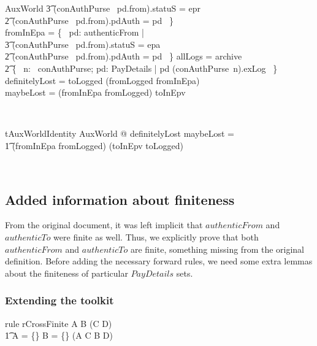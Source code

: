 \begin{LSDef}
\begin{schema}{AuxWorld}
          \t3 (conAuthPurse~ pd.from).statuS = epr \\
          \t2 \land (conAuthPurse~ pd.from).pdAuth = pd ~\} \\
   fromInEpa = \{~ pd: authenticFrom | \\
          \t3 (conAuthPurse~ pd.from).statuS = epa \\
          \t2 \land (conAuthPurse~ pd.from).pdAuth = pd ~\}
   \also
   allLogs = archive \cup \\
      \t2 \{~ n: \dom~conAuthPurse; pd: PayDetails | pd \in (conAuthPurse~n).exLog ~\}
   \also
   definitelyLost = toLogged \cap (fromLogged \cup fromInEpa) \\
   maybeLost = (fromInEpa \cup fromLogged) \cap toInEpv
\end{schema}~\end{LSDef}
%
\begin{LThm}
\begin{theorem}{tAuxWorldIdentity}
   \forall AuxWorld @ definitelyLost \cup maybeLost = \\
        \t1 (fromInEpa \cup fromLogged) \cap (toInEpv \cup toLogged)
\end{theorem}~\end{LThm}

\subsection{Added information about finiteness}


From the original document, it was left implicit that $authenticFrom$ and $authenticTo$ were finite as well.
Thus, we explicitly prove that both $authenticFrom$ and $authenticTo$ are finite, something missing from
the original definition. Before adding the necessary forward rules, we need some extra lemmas about the
finiteness of particular $PayDetails$ sets.

\subsubsection{Extending the toolkit}

\begin{LToolkit}
\begin{theorem}{rule rCrossFinite}
  A \cross B \in \finset (C \cross D) \iff \\\t1
  A = \{\} \lor B = \{\} \lor (A \in \finset C \land B \in \finset D)
\end{theorem}~\end{LToolkit}

